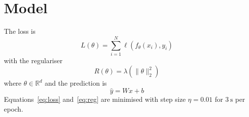 \documentclass{article}
\begin{document}
\section{Model}
The loss is
\begin{equation}
  L(\theta) = \sum_{i=1}^{N} \ell(f_\theta(x_i), y_i) \label{eq:loss}
\end{equation}
with the regulariser
\begin{equation}
  R(\theta) = \lambda \left( \|\theta\|_2^2 \right) \label{eq:reg}
\end{equation}
where $\theta \in \mathbb{R}^d$ and the prediction is
\[
  \hat{y} = W x + b
\]
Equations~\eqref{eq:loss} and~\eqref{eq:reg} are minimised with step size $\eta = 0.01$ for $3~\mathrm{s}$ per epoch.
\end{document}
